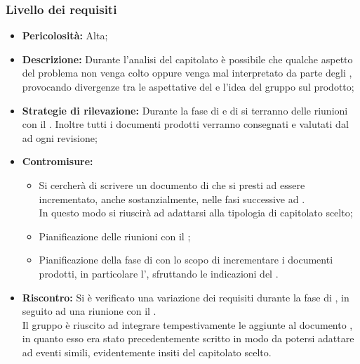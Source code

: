 \subsubsection{Livello dei requisiti}\label{lr}
\label{r_req}
\begin{itemize}
\item \textbf{Pericolosità:} Alta;
\item \textbf{Descrizione:} Durante l'analisi del capitolato è possibile che qualche aspetto del problema non venga colto oppure venga mal interpretato da parte degli \rAs, provocando divergenze tra le aspettative del  e l'idea del gruppo sul prodotto;
\item \textbf{Strategie di rilevazione:} Durante la fase di \fA e di \fAD si terranno delle riunioni con il . Inoltre tutti i documenti prodotti verranno consegnati e valutati dal  ad ogni revisione;
\item \textbf{Contromisure:}
\begin{itemize}
\item Si cercherà di scrivere un documento di \AR che si presti ad essere incrementato, anche sostanzialmente, nelle fasi successive ad \fA. \\ In questo modo si riuscirà ad adattarsi alla tipologia di capitolato scelto;
\item Pianificazione delle riunioni con il ;
\item Pianificazione della fase di \fAD con lo scopo di incrementare i documenti prodotti, in particolare l'\AR, sfruttando le indicazioni del .
\end{itemize}
\item \textbf{Riscontro:}
Si è verificato una variazione dei requisiti durante la fase di \fPA, in seguito ad una riunione con il . \\
Il gruppo è riuscito ad integrare tempestivamente le aggiunte al documento \AR, in quanto esso era stato precedentemente scritto in modo da potersi adattare ad eventi simili, evidentemente insiti del capitolato scelto.
\end{itemize}
